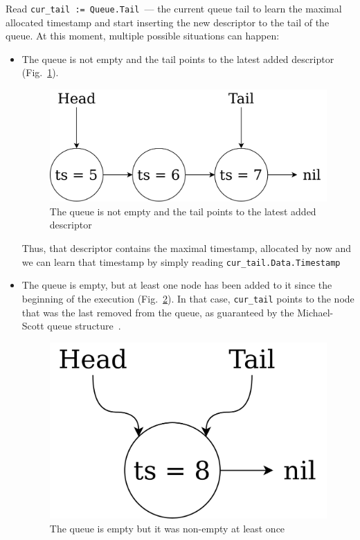 \documentclass[times, dvipsnames,%
               languages={russian,english} %
              ]{itmo-student-thesis}
\begin{document}
\begin{nenum}
    \item Read \texttt{cur\_tail := Queue.Tail}~--- the current queue tail to learn the maximal allocated timestamp and start inserting the new descriptor to the tail of the queue. At this moment, multiple possible situations can happen:
    
    \begin{itemize}
        \item The queue is not empty and the tail points to the latest added descriptor (Fig.~\ref{root-queue-normal-pic}).
        
        \begin{figure}[H]
          \centering
          \caption{The queue is not empty and the tail points to the latest added descriptor}
          \label{root-queue-normal-pic}
          \includegraphics[width=0.7\linewidth]{pics/root-queue-normal.png}
        \end{figure}
        
        Thus, that descriptor contains the maximal timestamp, allocated by now and we can learn that timestamp by simply reading \texttt{cur\_tail.Data.Timestamp}
        
        \item The queue is empty, but at least one node has been added to it since the beginning of the execution (Fig.~\ref{root-queue-empty-non-dummy-pic}). In that case, \texttt{cur\_tail} points to the node that was the last removed from the queue, as guaranteed by the Michael-Scott queue structure~\cite{michael1996simple}. 
        
        \begin{figure}[H]
          \centering
          \caption{The queue is empty but it was non-empty at least once}
          \label{root-queue-empty-non-dummy-pic}
          \includegraphics[width=0.7\linewidth]{pics/root-queue-empty-non-dummy.png}
        \end{figure}
        

\end{itemize}
\end{nenum}
\end{document}

